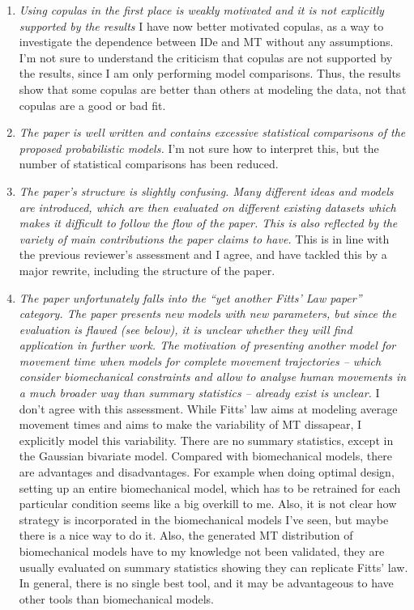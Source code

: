 \documentclass{article}
\begin{document}
\begin{enumerate}
    \item \textit{Using copulas in the first place is weakly motivated and it is not explicitly supported by the results} I have now better motivated copulas, as a way to investigate the dependence between IDe and MT without any assumptions. I'm not sure to understand the criticism that copulas are not supported by the results, since I am only performing model comparisons. Thus, the results show that some copulas are better than others at modeling the data, not that copulas are a good or bad fit.
    \item \textit{The paper is well written and contains excessive statistical comparisons of the proposed probabilistic models.} I'm not sure how to interpret this, but the number of statistical comparisons has been reduced.
    \item \textit{The paper’s structure is slightly confusing. Many different ideas and models are introduced, which are then evaluated on different existing datasets which makes it difficult to follow the flow of the paper. This is also reflected by the variety of main contributions the paper claims to have. } This is in line with the previous reviewer's assessment and I agree, and have tackled this by a major rewrite, including the structure of the paper.
    \item \textit{The paper unfortunately falls into the “yet another Fitts’ Law paper” category. The paper presents new models with new parameters, but since the evaluation is flawed (see below), it is unclear whether they will find application in further work. The motivation of presenting another model for movement time when models for complete movement trajectories -- which consider biomechanical constraints and allow to analyse human movements in a much broader way than summary statistics -- already exist is unclear. } I don't agree with this assessment. While Fitts' law aims at modeling average movement times and aims to make the variability of MT dissapear, I explicitly model this variability. There are no summary statistics, except in the Gaussian bivariate model. Compared with biomechanical models, there are advantages and disadvantages. For example when doing optimal design, setting up an entire biomechanical model, which has to be retrained for each particular condition seems like a big overkill to me. Also, it is not clear how strategy is incorporated in the biomechanical models I've seen, but maybe there is a nice way to do it. Also, the generated MT distribution of biomechanical models have to my knowledge not been validated, they are usually evaluated on summary statistics \eg showing they can replicate Fitts' law. In general, there is no single best tool, and it may be advantageous to have other tools than biomechanical models. 

\end{enumerate}
\end{document}
